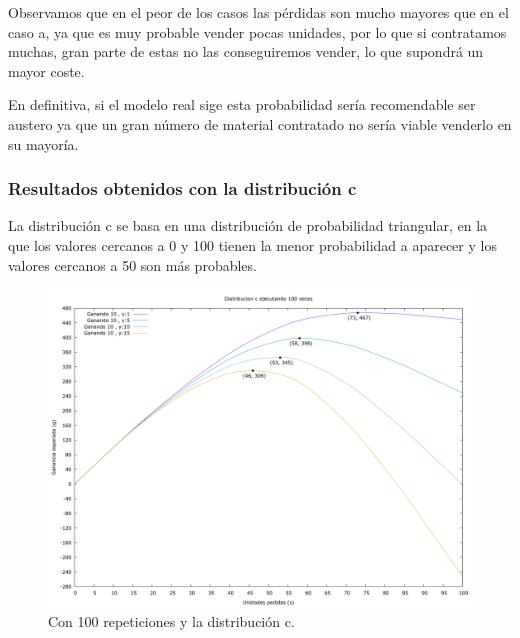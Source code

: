 \documentclass[12pt, spanish]{article}
\begin{document}
Observamos que en el peor de los casos las pérdidas son mucho mayores que en el caso a, ya que es muy probable vender pocas unidades, por lo que si contratamos muchas, gran parte de estas no las conseguiremos vender, lo que supondrá un mayor coste.

En definitiva, si el modelo real sige esta probabilidad sería recomendable ser austero ya que un gran número de material contratado no sería viable venderlo en su mayoría.


\subsubsection{Resultados obtenidos con la distribución c}


La distribución c se basa en una distribución de probabilidad triangular, en la que los valores cercanos a 0 y 100 tienen la menor probabilidad a aparecer y los valores cercanos a 50 son más probables.

\begin{figure}[H]
	\centering
	\includegraphics[scale = 0.2]{prob_c/datos_c_100.png}
	\caption{Con 100 repeticiones y la distribución c.}
	\label{fig:ej1_a_100}

\end{figure}
\end{document}
